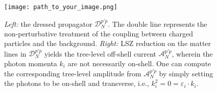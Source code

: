 \documentclass{article}
\begin{document}
\begin{figure}[h]
    \centering
    \texttt{[image: path\_to\_your\_image.png]}
    \caption{
        \textit{Left:} the dressed propagator $\mathcal{D}^{p'p}_{N}$. The double line represents the non-perturbative treatment of the coupling between charged particles and the background.
        \textit{Right:} LSZ reduction on the matter lines in $\mathcal{D}^{p'p}_{N}$ yields the tree-level off-shell current $\mathcal{A}^{p'p}_{N}$, wherein the photon momenta $k_i$ are not necessarily on-shell. One can compute the corresponding tree-level amplitude from $\mathcal{A}^{p'p}_{N}$ by simply setting the photons to be on-shell and transverse, i.e., $k_i^2 = 0 = \varepsilon_{i} \cdot k_{i}$.
    }
    \label{fig:dressed_propagator}
\end{figure}
\end{document}
